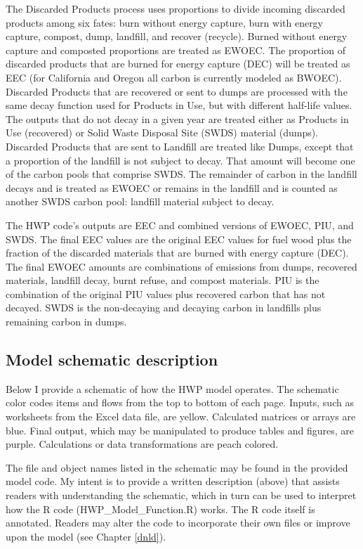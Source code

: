 \documentclass[
  openany]{book}
\begin{document}
The Discarded Products process uses proportions to divide incoming discarded products among six fates: burn without energy capture, burn with energy capture, compost, dump, landfill, and recover (recycle). Burned without energy capture and composted proportions are treated as EWOEC. The proportion of discarded products that are burned for energy capture (DEC) will be treated as EEC (for California and Oregon all carbon is currently modeled as BWOEC). Discarded Products that are recovered or sent to dumps are processed with the same decay function used for Products in Use, but with different half-life values. The outputs that do not decay in a given year are treated either as Products in Use (recovered) or Solid Waste Disposal Site (SWDS) material (dumps). Discarded Products that are sent to Landfill are treated like Dumps, except that a proportion of the landfill is not subject to decay. That amount will become one of the carbon pools that comprise SWDS. The remainder of carbon in the landfill decays and is treated as EWOEC or remains in the landfill and is counted as another SWDS carbon pool: landfill material subject to decay.

The HWP code's outputs are EEC and combined versions of EWOEC, PIU, and SWDS. The final EEC values are the original EEC values for fuel wood plus the fraction of the discarded materials that are burned with energy capture (DEC). The final EWOEC amounts are combinations of emissions from dumps, recovered materials, landfill decay, burnt refuse, and compost materials. PIU is the combination of the original PIU values plus recovered carbon that has not decayed. SWDS is the non-decaying and decaying carbon in landfills plus remaining carbon in dumps.

\hypertarget{model-func-schdesc}{%
\subsection{Model schematic description}\label{model-func-schdesc}}

Below I provide a schematic of how the HWP model operates. The schematic color codes items and flows from the top to bottom of each page. Inputs, such as worksheets from the Excel data file, are yellow. Calculated matrices or arrays are blue. Final output, which may be manipulated to produce tables and figures, are purple. Calculations or data transformations are peach colored.

The file and object names listed in the schematic may be found in the provided model code. My intent is to provide a written description (above) that assists readers with understanding the schematic, which in turn can be used to interpret how the R code (HWP\_Model\_Function.R) works. The R code itself is annotated. Readers may alter the code to incorporate their own files or improve upon the model (see Chapter \ref{dnld}).
\end{document}
